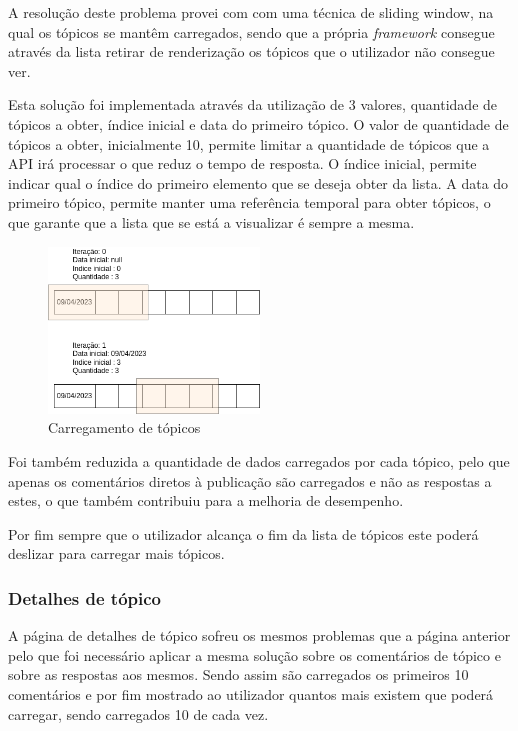A resolução deste problema provei com com uma técnica de sliding window, na qual os tópicos se mantêm carregados, sendo que a própria \textit{framework} consegue através da lista retirar de renderização os tópicos que o utilizador não consegue ver. 

Esta solução foi implementada através da utilização de 3 valores, quantidade de tópicos a obter, índice inicial e data do primeiro tópico. O valor de quantidade de tópicos a obter, inicialmente 10, permite limitar a quantidade de tópicos que a API irá processar o que reduz o tempo de resposta. O índice inicial, permite indicar qual o índice do primeiro elemento que se deseja obter da lista. A data do primeiro tópico, permite manter uma referência temporal para obter tópicos, o que garante que a lista que se está a visualizar é sempre a mesma.

\begin{figure}[htb]
  \centering
  \includegraphics[width=0.5\textwidth]{images/implementacao/frontend/forum/loading_topics/topics_loading.png}
  \caption{Carregamento de tópicos}
  \label{fig:74}
\end{figure}

Foi também reduzida a quantidade de dados carregados por cada tópico, pelo que apenas os comentários diretos à publicação são carregados e não as respostas a estes, o que também contribuiu para a melhoria de desempenho.

Por fim sempre que o utilizador alcança o fim da lista de tópicos este poderá deslizar para carregar mais tópicos.

\newpage

\subsubsection{Detalhes de tópico}

A página de detalhes de tópico sofreu os mesmos problemas que a página anterior pelo que foi necessário aplicar a mesma solução sobre os comentários de tópico e sobre as respostas aos mesmos. Sendo assim são carregados os primeiros 10 comentários e por fim mostrado ao utilizador quantos mais existem que poderá carregar, sendo carregados 10 de cada vez.

